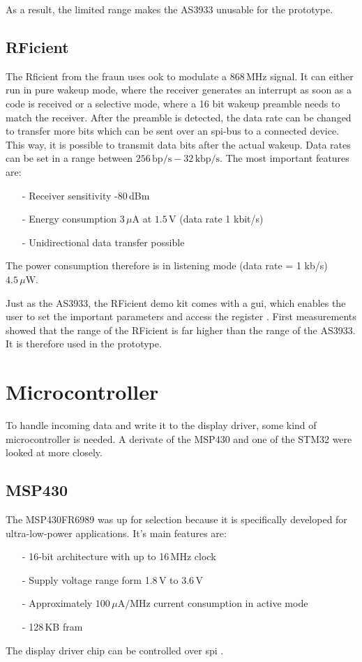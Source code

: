 As a result, the limited range makes the AS3933 unusable for the prototype. 

\subsection{RFicient}
The Rficient from the \acs{fraun} uses \acs{ook} to modulate a 868\,MHz signal.
It can either run in pure wakeup mode, where the receiver generates an interrupt as soon as a code is received or a selective mode, where a 16 bit wakeup preamble needs to match the receiver. 
After the preamble is detected, the data rate can be changed to transfer more bits which can be sent over an \acs{spi}-bus to a connected device.
This way, it is possible to transmit data bits after the actual wakeup.
Data rates can be set in a range between $256\,\text{bp/s}-32\,\text{kbp/s}$.
The most important features are:
\begin{itemize}
	\item[-] Receiver sensitivity -80\,dBm
	\item[-] Energy consumption $3\,\mu\text{A}$ at $1.5\,\text{V}$ (data rate 1 kbit/s)
	\item[-] Unidirectional data transfer possible	
\end{itemize}
The power consumption therefore is in listening mode (data rate = 1 kb/s) $4.5\,\mu\text{W}$.

Just as the AS3933, the RFicient demo kit comes with a \acs{gui}, which enables the user to set the important parameters and access the register \cite{rficient}.
First measurements showed that the range of the RFicient is far higher than the range of the AS3933.
It is therefore used in the prototype.

\section{Microcontroller}
To handle incoming data and write it to the display driver, some kind of microcontroller is needed.
A derivate of the MSP430 and one of the STM32 were looked at more closely.

\subsection{MSP430}
The MSP430FR6989 was up for selection because it is specifically developed for ultra-low-power applications.
It's main features are:
\begin{itemize}
	\item[-] 16-bit architecture with up to 16\,MHz clock
	\item[-] Supply voltage range form 1.8\,V to 3.6\,V
	\item[-] Approximately  $100\,\mu\text{A}/\text{MHz}$ current consumption in active mode
	\item[-] 128\,KB \acf{fram}
\end{itemize}
The display driver chip can be controlled over \acs{spi}  \cite{msp430}.

